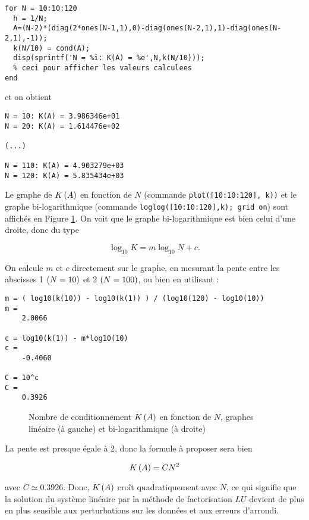 \begin{enumerate}[label=\alph*)]
\begin{verbatim}
for N = 10:10:120
  h = 1/N;
  A=(N-2)*(diag(2*ones(N-1,1),0)-diag(ones(N-2,1),1)-diag(ones(N-2,1),-1));
  k(N/10) = cond(A);
  disp(sprintf('N = %i: K(A) = %e',N,k(N/10)));
  % ceci pour afficher les valeurs calculees
end
\end{verbatim}        
        
        et on obtient
 
\begin{verbatim}
N = 10: K(A) = 3.986346e+01
N = 20: K(A) = 1.614476e+02

(...)

N = 110: K(A) = 4.903279e+03
N = 120: K(A) = 5.835434e+03
\end{verbatim} 

    Le graphe de $K \left(A\right)$ en fonction de $N$ (commande \texttt{plot([10:10:120], k))} et le graphe bi-logarithmique (commande \texttt{loglog([10:10:120],k); grid on}) sont affichés en Figure \ref{fig:cond}.
    On voit que le graphe bi-logarithmique est bien celui d'une droite, donc du type
    
    \begin{equation*}
      \log_{10} K = m \log_{10} N + c.
    \end{equation*}
    
    On calcule $m$ et $c$ directement sur le graphe, en mesurant la pente entre les abscisses 1 $\left(N = 10\right)$ et 2 $\left(N = 100\right)$, ou bien en utilisant \MAT :
    
\begin{verbatim}
m = ( log10(k(10)) - log10(k(1)) ) / (log10(120) - log10(10))
m =
    2.0066
    
c = log10(k(1)) - m*log10(10)
c = 
    -0.4060
    
C = 10^c
C =
    0.3926
\end{verbatim} 

\begin{figure}[h!]
  \centering
  \caption{Nombre de conditionnement $K \left(A\right)$ en fonction de $N$, graphes linéaire (à gauche) et bi-logarithmique (à droite)}
  \label{fig:cond}
\end{figure}

      La pente est presque égale à 2, donc la formule à proposer sera bien
      
      \begin{equation*}
        K \left(A\right) = C N^{2}
      \end{equation*}
      
       avec $C \simeq 0.3926$.
       Donc, $K \left(A\right)$ croît quadratiquement avec $N$, ce qui signifie que la solution du système linéaire par la méthode de factorisation $LU$ devient de plus en plus sensible aux perturbations sur les données et aux erreurs d'arrondi.

  


         
         
         
  
  
\end{enumerate}